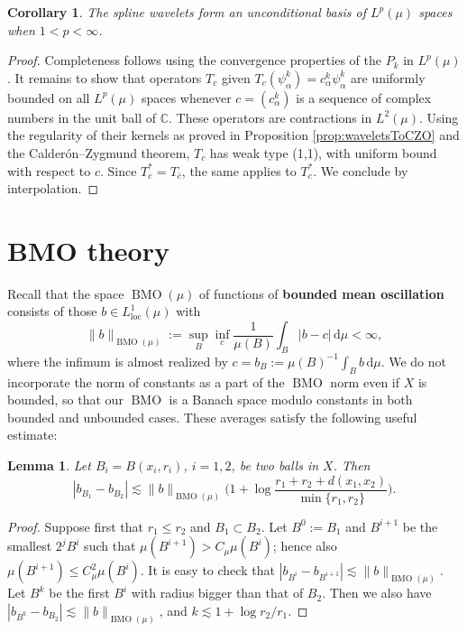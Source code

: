 \documentclass{amsart}
\numberwithin{equation}{section}
\theoremstyle{plain}
\newtheorem{corollary}[equation]{Corollary}
\newtheorem{lemma}[equation]{Lemma}
\theoremstyle{definition}
\theoremstyle{remark}
\begin{document}
{{{\begin{corollary}
The spline wavelets form an unconditional basis of $L^p(\mu)$ spaces when $1<p<\infty$. 
\end{corollary}

\begin{proof} 
Completeness follows using the convergence properties of the $P_{k}$ in $L^p(\mu)$. It remains to show that  operators $T_{c}$  given $T_{c}(\psi^k_{\alpha})=c^k_{\alpha}\psi^k_{\alpha}$ are uniformly bounded on all $L^p(\mu)$ spaces whenever $c=(c^{k}_{\alpha})$ is a sequence of complex numbers in the unit ball of $\mathbb{C}$. These operators are contractions in $L^2(\mu)$.  Using the regularity of their kernels  as proved in Proposition \ref{prop:waveletsToCZO} and the Calder\'on--Zygmund theorem, $T_{c}$ has weak type (1,1), with uniform bound with respect to $c$. Since $T_{c}^*=T_{\bar c}$, the same applies to $T_{c}^*$. We conclude by interpolation.  
\end{proof}

\section{BMO theory}

Recall that the space ${\operatorname{BMO}}(\mu)$ of functions of \textbf{bounded mean oscillation} consists of those $b\in L^1_{\operatorname{loc}}(\mu)$ with
\begin{equation*}
  {\|{b}\|_{{{\operatorname{BMO}}(\mu)}}}:=\sup_B\inf_c\frac{1}{\mu(B)}\int_B{|{b-c}|}{\,\mathrm{d}}\mu<\infty,
\end{equation*}
where the infimum is almost realized by $c=b_B:=\mu(B)^{-1}\int_B b{\,\mathrm{d}}\mu$. { We do not incorporate {the norm of constants as a part of the ${\operatorname{BMO}}$ norm} even if $X$ is bounded, so that our ${\operatorname{BMO}}$ is a Banach space modulo constants in both bounded and unbounded cases.} These averages satisfy the following useful estimate:

\begin{lemma}\label{lem:bBs}
Let $B_i=B(x_i,r_i)$, $i=1,2$, be two balls in $X$. Then
\begin{equation*}
  {|{b_{B_1}-b_{B_2}}|}\lesssim{\|{b}\|_{{{\operatorname{BMO}}(\mu)}}}\Big(1+\log\frac{r_1+r_2+d(x_1,x_2)}{\min\{r_1,r_2\}}\Big).
\end{equation*}
\end{lemma}

\begin{proof}
Suppose first that $r_1\leq r_2$ and $B_1\subset B_2$. Let $B^0:=B_1$ and $B^{i+1}$ be the smallest $2^j B^i$ such that $\mu(B^{i+1})>C_\mu\mu(B^i)$; hence also $\mu(B^{i+1})\leq C_\mu^2\mu(B^i)$. It is easy to check that ${|{b_{B^i}-b_{B^{i+1}}}|}\lesssim{\|{b}\|_{{{\operatorname{BMO}}(\mu)}}}$. Let $B^k$ be the first $B^i$ with radius bigger than that of $B_2$. Then we also have ${|{b_{B^k}-b_{B_2}}|}\lesssim{\|{b}\|_{{{\operatorname{BMO}}(\mu)}}}$, and $k\lesssim 1+\log r_2/r_1$.


\end{proof}}}}
\end{document}
